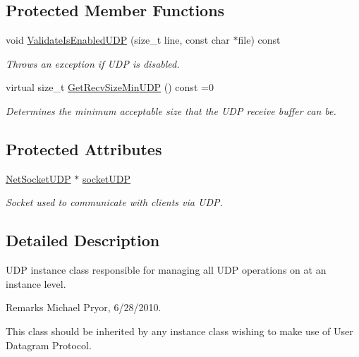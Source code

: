 \subsection*{Protected Member Functions}
\begin{DoxyCompactItemize}
\item 
void \hyperlink{class_net_instance_u_d_p_a869976b5c24d3ce4d4318a7072133e99}{ValidateIsEnabledUDP} (size\_\-t line, const char $\ast$file) const 
\begin{DoxyCompactList}\small\item\em Throws an exception if UDP is disabled. \item\end{DoxyCompactList}\item 
virtual size\_\-t \hyperlink{class_net_instance_u_d_p_a66b09a826a620f60707158d5cb11febc}{GetRecvSizeMinUDP} () const =0
\begin{DoxyCompactList}\small\item\em Determines the minimum acceptable size that the UDP receive buffer can be. \item\end{DoxyCompactList}\end{DoxyCompactItemize}
\subsection*{Protected Attributes}
\begin{DoxyCompactItemize}
\item 
\hypertarget{class_net_instance_u_d_p_af86e8343ddf2daf0ce3f9ea701bc7cf3}{
\hyperlink{class_net_socket_u_d_p}{NetSocketUDP} $\ast$ \hyperlink{class_net_instance_u_d_p_af86e8343ddf2daf0ce3f9ea701bc7cf3}{socketUDP}}
\label{class_net_instance_u_d_p_af86e8343ddf2daf0ce3f9ea701bc7cf3}

\begin{DoxyCompactList}\small\item\em Socket used to communicate with clients via UDP. \item\end{DoxyCompactList}\end{DoxyCompactItemize}


\subsection{Detailed Description}
UDP instance class responsible for managing all UDP operations on at an instance level. \begin{DoxyRemark}{Remarks}
Michael Pryor, 6/28/2010.
\end{DoxyRemark}
This class should be inherited by any instance class wishing to make use of User Datagram Protocol. 


